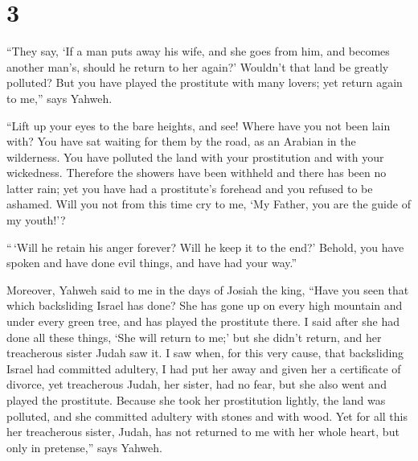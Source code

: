 \hypertarget{section-2}{%
\section{3}\label{section-2}}

 ``They say, `If a man puts away his wife, and she goes
from him, and becomes another man's, should he return to her again?'
Wouldn't that land be greatly polluted? But you have played the
prostitute with many lovers; yet return again to me,'' says Yahweh.

 ``Lift up your eyes to the bare heights, and see! Where
have you not been lain with? You have sat waiting for them by the road,
as an Arabian in the wilderness. You have polluted the land with your
prostitution and with your wickedness.  Therefore the
showers have been withheld and there has been no latter rain; yet you
have had a prostitute's forehead and you refused to be ashamed.
 Will you not from this time cry to me, `My Father, you
are the guide of my youth!'?

 ``\,`Will he retain his anger forever? Will he keep it to
the end?' Behold, you have spoken and have done evil things, and have
had your way.''

 Moreover, Yahweh said to me in the days of Josiah the
king, ``Have you seen that which backsliding Israel has done? She has
gone up on every high mountain and under every green tree, and has
played the prostitute there.  I said after she had done
all these things, `She will return to me;' but she didn't return, and
her treacherous sister Judah saw it.  I saw when, for this
very cause, that backsliding Israel had committed adultery, I had put
her away and given her a certificate of divorce, yet treacherous Judah,
her sister, had no fear, but she also went and played the prostitute.
 Because she took her prostitution lightly, the land was
polluted, and she committed adultery with stones and with wood.
 Yet for all this her treacherous sister, Judah, has not
returned to me with her whole heart, but only in pretense,'' says
Yahweh.

